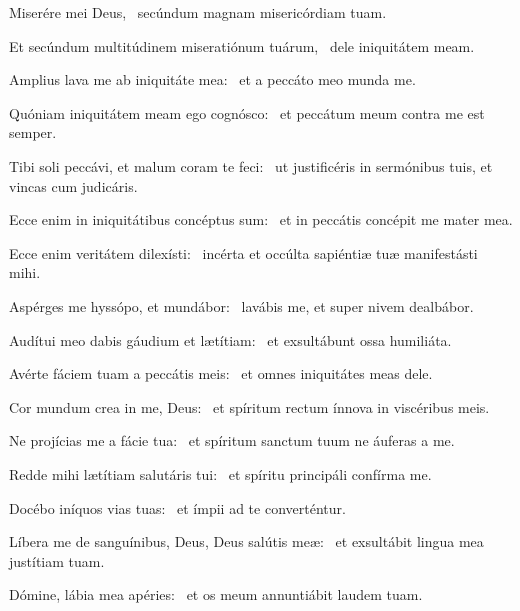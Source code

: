 \item Miserére mei Deus,~\psstar{} secúndum magnam misericórdiam tuam.

\item Et secúndum multitúdinem miseratiónum tuárum,~\psstar{} dele iniquitátem meam.

\item Amplius lava me ab iniquitáte mea:~\psstar{} et a peccáto meo munda me.

\item Quóniam iniquitátem meam ego cognósco:~\psstar{} et peccátum meum contra me est semper.

\item Tibi soli peccávi, et malum coram te feci:~\psstar{} ut justificéris in sermónibus tuis, et vincas cum judicáris.

\item Ecce enim in iniquitátibus concéptus sum:~\psstar{} et in peccátis concépit me mater mea.

\item Ecce enim veritátem dilexísti:~\psstar{} incérta et occúlta sapiéntiæ tuæ manifestásti mihi.

\item Aspérges me hyssópo, et mundábor:~\psstar{} lavábis me, et super nivem dealbábor.

\item Audítui meo dabis gáudium et lætítiam:~\psstar{} et exsultábunt ossa humiliáta.

\item Avérte fáciem tuam a peccátis meis:~\psstar{} et omnes iniquitátes meas dele.

\item Cor mundum crea in me, Deus:~\psstar{} et spíritum rectum ínnova in viscéribus meis.

\item Ne projícias me a fácie tua:~\psstar{} et spíritum sanctum tuum ne áuferas a me.

\item Redde mihi lætítiam salutáris tui:~\psstar{} et spíritu principáli confírma me.

\item Docébo iníquos vias tuas:~\psstar{} et ímpii ad te converténtur.

\item Líbera me de sanguínibus, Deus, Deus salútis meæ:~\psstar{} et exsultábit lingua mea justítiam tuam.

\item Dómine, lábia mea apéries:~\psstar{} et os meum annuntiábit laudem tuam.

